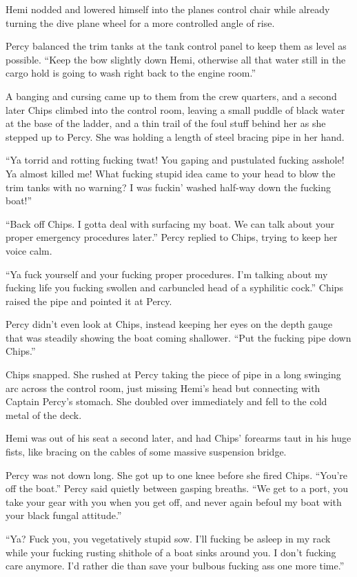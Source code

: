 \documentclass[
]{scrbook}
\begin{document}
Hemi nodded and lowered himself into the planes control chair while
already turning the dive plane wheel for a more controlled angle of
rise.

Percy balanced the trim tanks at the tank control panel to keep them as
level as possible. ``Keep the bow slightly down Hemi, otherwise all that
water still in the cargo hold is going to wash right back to the engine
room.''

A banging and cursing came up to them from the crew quarters, and a
second later Chips climbed into the control room, leaving a small puddle
of black water at the base of the ladder, and a thin trail of the foul
stuff behind her as she stepped up to Percy. She was holding a length of
steel bracing pipe in her hand.

``Ya torrid and rotting fucking twat! You gaping and pustulated fucking
asshole! Ya almost killed me! What fucking stupid idea came to your head
to blow the trim tanks with no warning? I was fuckin' washed half-way
down the fucking boat!''

``Back off Chips. I gotta deal with surfacing my boat. We can talk about
your proper emergency procedures later.'' Percy replied to Chips, trying
to keep her voice calm.

``Ya fuck yourself and your fucking proper procedures. I'm talking about
my fucking life you fucking swollen and carbuncled head of a syphilitic
cock.'' Chips raised the pipe and pointed it at Percy.

Percy didn't even look at Chips, instead keeping her eyes on the depth
gauge that was steadily showing the boat coming shallower. ``Put the
fucking pipe down Chips.''

Chips snapped. She rushed at Percy taking the piece of pipe in a long
swinging arc across the control room, just missing Hemi's head but
connecting with Captain Percy's stomach. She doubled over immediately
and fell to the cold metal of the deck.

Hemi was out of his seat a second later, and had Chips' forearms taut in
his huge fists, like bracing on the cables of some massive suspension
bridge.

Percy was not down long. She got up to one knee before she fired Chips.
``You're off the boat.'' Percy said quietly between gasping breaths.
``We get to a port, you take your gear with you when you get off, and
never again befoul my boat with your black fungal attitude.''

``Ya? Fuck you, you vegetatively stupid sow. I'll fucking be asleep in
my rack while your fucking rusting shithole of a boat sinks around you.
I don't fucking care anymore. I'd rather die than save your bulbous
fucking ass one more time.''
\end{document}

